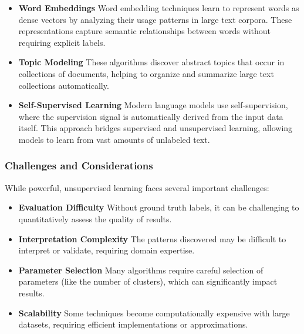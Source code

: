 \begin{itemize}[noitemsep]
    \item \textbf{Word Embeddings}
    Word embedding techniques learn to represent words as dense vectors by analyzing their usage patterns in large text corpora. These representations capture semantic relationships between words without requiring explicit labels.
    
    \item \textbf{Topic Modeling}
    These algorithms discover abstract topics that occur in collections of documents, helping to organize and summarize large text collections automatically.
    
    \item \textbf{Self-Supervised Learning}
    Modern language models use self-supervision, where the supervision signal is automatically derived from the input data itself. This approach bridges supervised and unsupervised learning, allowing models to learn from vast amounts of unlabeled text.
\end{itemize}

\subsubsection{Challenges and Considerations}
\noindent
While powerful, unsupervised learning faces several important challenges:

\begin{itemize}[noitemsep]
    \item \textbf{Evaluation Difficulty}
    Without ground truth labels, it can be challenging to quantitatively assess the quality of results.
    
    \item \textbf{Interpretation Complexity}
    The patterns discovered may be difficult to interpret or validate, requiring domain expertise.
    
    \item \textbf{Parameter Selection}
    Many algorithms require careful selection of parameters (like the number of clusters), which can significantly impact results.
    
    \item \textbf{Scalability}
    Some techniques become computationally expensive with large datasets, requiring efficient implementations or approximations.
\end{itemize}

